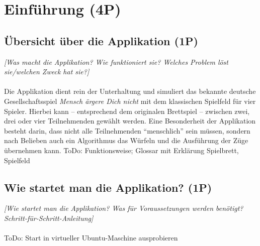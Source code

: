 
\titlespacing*{\chapter}{0pt}{-30mm}{10pt}
  
\chapter{Einführung (4P)}
\pagestyle{scrheadings}
\clearscrheadfoot
{}
\setcounter{page}{1}
\ofoot[\pagemark]{\pagemark}
\onehalfspacing

\section{Übersicht über die Applikation (1P)}
\emph{[Was macht die Applikation? Wie funktioniert sie? Welches Problem löst sie/welchen Zweck hat sie?]}
\\
\\
\noindent Die Applikation dient rein der Unterhaltung und simuliert das bekannte deutsche Gesell\-schaftsspiel \emph{Mensch ärgere Dich nicht} mit dem klassischen Spielfeld für vier Spieler. Hierbei kann -- entsprechend dem originalen Brettspiel -- zwischen zwei, drei oder vier Teilnehmenden gewählt werden. Eine Besonderheit der Applikation besteht darin, dass nicht alle Teilnehmenden \enquote{menschlich} sein müssen, sondern nach Belieben auch ein Algorithmus das Würfeln und die Ausführung der Züge übernehmen kann. ToDo: Funktionsweise; Glossar mit Erklärung Spielbrett, Spielfeld

\section{Wie startet man die Applikation? (1P)}
\emph{[Wie startet man die Applikation? Was für Voraussetzungen werden benötigt? Schritt-für-Schritt-Anleitung]}
\\
\\
\noindent ToDo: Start in virtueller Ubuntu-Maschine ausprobieren


